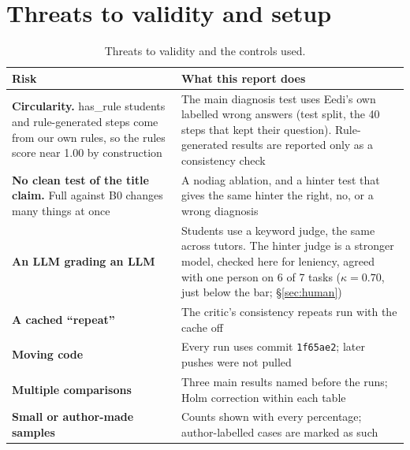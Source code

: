 \documentclass[11pt,a4paper]{article}
\newcommand{\code}[1]{\texttt{#1}}
\newcommand{\grp}[1]{\textsf{#1}}
\newcommand{\cond}[1]{\textsf{#1}}
\begin{document}
\section{Threats to validity and setup}\label{app:setup}
\begin{table}[H]
\centering\small
\begin{tabularx}{\linewidth}{@{}P{4.2cm}Y@{}}
\toprule
Risk & What this report does \\
\midrule
\textbf{Circularity.} \grp{has\_rule} students and rule-generated steps come from our own rules, so the rules score near 1.00 by construction & The main diagnosis test uses Eedi's own labelled wrong answers (test split, the 40 steps that kept their question). Rule-generated results are reported only as a consistency check \\
\textbf{No clean test of the title claim.} Full against B0 changes many things at once & A \cond{nodiag} ablation, and a hinter test that gives the same hinter the right, no, or a wrong diagnosis \\
\textbf{An LLM grading an LLM} & Students use a keyword judge, the same across tutors. The hinter judge is a stronger model, checked here for leniency, agreed with one person on 6 of 7 tasks ($\kappa = 0.70$, just below the bar; \S\ref{sec:human}) \\
\textbf{A cached ``repeat''} & The critic's consistency repeats run with the cache off \\
\textbf{Moving code} & Every run uses commit \code{1f65ae2}; later pushes were not pulled \\
\textbf{Multiple comparisons} & Three main results named before the runs; Holm correction within each table \\
\textbf{Small or author-made samples} & Counts shown with every percentage; author-labelled cases are marked as such \\
\bottomrule
\end{tabularx}
\caption{Threats to validity and the controls used.}
\end{table}
\end{document}
